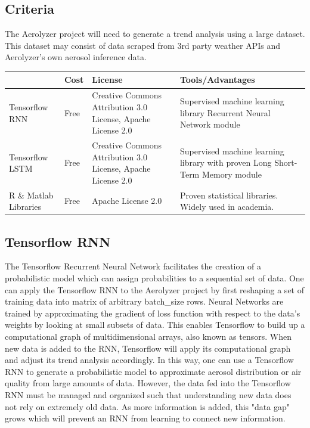 \documentclass[onecolumn, draftclsnofoot,10pt, compsoc]{IEEEtran}
\begin{document}
\begin{singlespace}
	\subsection{Criteria}
		The Aerolyzer project will need to generate a trend analysis using a large dataset.
		This dataset may consist of data scraped from 3rd party weather APIs and Aerolyzer’s own aerosol inference data.			
		\begin{center}
			\begin{tabular}{|l|p{3cm}|p{5cm}|p{5cm}|}
			\hline \textbf{} & \textbf{Cost} & \textbf{License} & \textbf{Tools/Advantages} \\\hline
			Tensorflow RNN & Free & Creative Commons Attribution 3.0 License, Apache License 2.0 & Supervised machine learning library Recurrent Neural Network module\\\hline
			Tensorflow LSTM& Free & Creative Commons Attribution 3.0 License, Apache License 2.0 & Supervised machine learning library with proven Long Short-Term Memory module\\\hline
			R \& Matlab Libraries & Free & Apache License 2.0 & Proven statistical libraries. Widely used in academia.\\\hline
			\end{tabular}
		\end{center}

	\subsection{Tensorflow RNN}
		The Tensorflow Recurrent Neural Network facilitates the creation of a probabilistic model which can assign probabilities to a sequential set of data.
		One can apply the Tensorflow RNN to the Aerolyzer project by first reshaping a set of training data into matrix of arbitrary batch\_size rows.
		Neural Networks are trained by approximating the gradient of loss function with respect to the data’s weights by looking at small subsets of data.
		This enables Tensorflow to build up a computational graph of multidimensional arrays, also known as tensors.
		When new data is added to the RNN, Tensorflow will apply its computational graph and adjust its trend analysis accordingly.
		In this way, one can use a Tensorflow RNN to generate a probabilistic model to approximate aerosol distribution or air quality from large amounts of data.
		However, the data fed into the Tensorflow RNN must be managed and organized such that understanding new data does not rely on extremely old data.
		As more information is added, this "data gap" grows which will prevent an RNN from learning to connect new information. \cite{RNN}


\end{singlespace}
\end{document}
